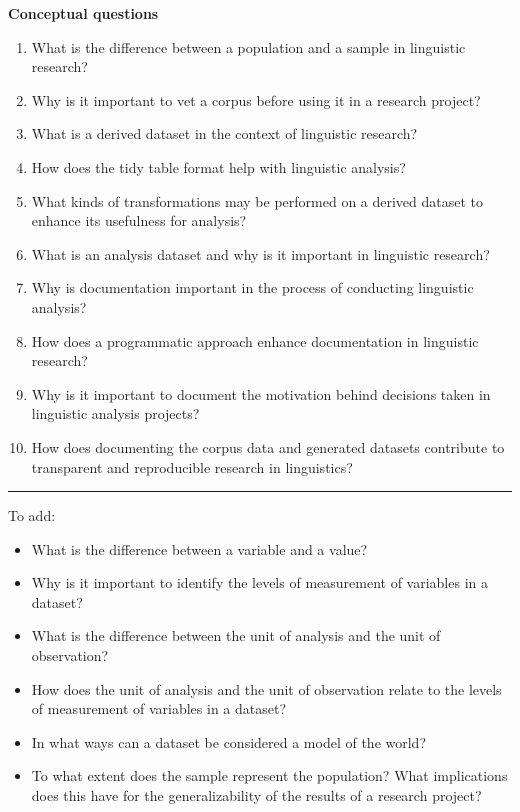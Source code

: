\documentclass[
  letterpaper,
]{latex/krantz}
\providecommand{\tightlist}{%
  \setlength{\itemsep}{0pt}\setlength{\parskip}{0pt}}\usepackage{longtable,booktabs,array}
\begin{document}
\begin{tcolorbox}[enhanced jigsaw, left=2mm, arc=.35mm, colback=white, rightrule=.15mm, toprule=.15mm, breakable, leftrule=.75mm, opacityback=0, bottomrule=.15mm]

\textbf{Conceptual questions}

\begin{enumerate}
\def\labelenumi{\arabic{enumi}.}
\item
  What is the difference between a population and a sample in linguistic
  research?
\item
  Why is it important to vet a corpus before using it in a research
  project?
\item
  What is a derived dataset in the context of linguistic research?
\item
  How does the tidy table format help with linguistic analysis?
\item
  What kinds of transformations may be performed on a derived dataset to
  enhance its usefulness for analysis?
\item
  What is an analysis dataset and why is it important in linguistic
  research?
\item
  Why is documentation important in the process of conducting linguistic
  analysis?
\item
  How does a programmatic approach enhance documentation in linguistic
  research?
\item
  Why is it important to document the motivation behind decisions taken
  in linguistic analysis projects?
\item
  How does documenting the corpus data and generated datasets contribute
  to transparent and reproducible research in linguistics?
\end{enumerate}

\begin{center}\rule{0.5\linewidth}{0.5pt}\end{center}

To add:

\begin{itemize}
\tightlist
\item
  What is the difference between a variable and a value?
\item
  Why is it important to identify the levels of measurement of variables
  in a dataset?
\item
  What is the difference between the unit of analysis and the unit of
  observation?
\item
  How does the unit of analysis and the unit of observation relate to
  the levels of measurement of variables in a dataset?
\item
  In what ways can a dataset be considered a model of the world?
\item
  To what extent does the sample represent the population? What
  implications does this have for the generalizability of the results of
  a research project?
\end{itemize}

\end{tcolorbox}
\end{document}
